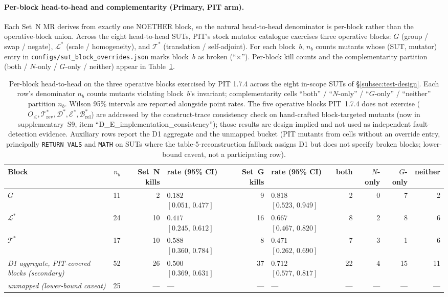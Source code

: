 \documentclass[acmsmall, screen]{acmart}
\begin{document}
\paragraph{Per-block head-to-head and complementarity (Primary, PIT arm).}
Each Set~N MR derives from exactly one NOETHER block, so the natural head-to-head denominator is per-block rather than the operative-block union. Across the eight head-to-head SUTs, PIT's stock mutator catalogue exercises three operative blocks: $G$ (group / swap / negate), $\mathcal{L}^{*}$ (scale / homogeneity), and $\mathcal{T}^{*}$ (translation / self-adjoint). For each block~$b$, $n_{b}$ counts mutants whose (SUT, mutator) entry in \texttt{configs/sut\_block\_overrides.json} marks block~$b$ as broken (``$\times$''). Per-block kill counts and the complementarity partition (both / $N$-only / $G$-only / neither) appear in Table~\ref{tab:per-block-headtohead}.

\begin{table}[h]
\centering
\caption{Per-block head-to-head on the three operative blocks
exercised by PIT 1.7.4 across the eight in-scope SUTs of
\S\ref{subsec:test-design}. Each row's denominator $n_{b}$ counts
mutants violating block~$b$'s invariant; complementarity cells
``both'' / ``$N$-only'' / ``$G$-only'' / ``neither'' partition $n_{b}$.
Wilson 95\% intervals are reported alongside point rates. The five
operative blocks PIT~1.7.4 does not exercise
($O_{\le}, \mathcal{T}^{*}_{\mathrm{rev}}, \mathcal{D}^{*},
\mathcal{E}^{*}, \mathcal{B}^{*}_{\mathrm{rel}}$) are addressed by
the construct-trace consistency check on hand-crafted
block-targeted mutants (now in supplementary~S9, item
``D\_E\_implementation\_consistency''); those results are
design-implied and not used as independent fault-detection
evidence. Auxiliary rows report the D1 aggregate and the unmapped
bucket (PIT mutants from cells without an override entry,
principally \texttt{RETURN\_VALS} and \texttt{MATH} on SUTs where
the table-5-reconstruction fallback assigns D1 but does not specify
broken blocks; lower-bound caveat, not a participating row).}
\label{tab:per-block-headtohead}
\small
\begin{tabular}{lrrlrlrrrr}
\toprule
Block & $n_{b}$ & Set~N kills & rate (95\% CI) & Set~G kills & rate (95\% CI) & both & $N$-only & $G$-only & neither \\
\midrule
$G$              & 11 &  2 & $0.182$ $[0.051,\,0.477]$ &  9 & $0.818$ $[0.523,\,0.949]$ & 2 & 0 & 7 & 2 \\
$\mathcal{L}^{*}$ & 24 & 10 & $0.417$ $[0.245,\,0.612]$ & 16 & $0.667$ $[0.467,\,0.820]$ & 8 & 2 & 8 & 6 \\
$\mathcal{T}^{*}$ & 17 & 10 & $0.588$ $[0.360,\,0.784]$ &  8 & $0.471$ $[0.262,\,0.690]$ & 7 & 3 & 1 & 6 \\
\midrule
\textit{D1 aggregate, PIT-covered blocks (secondary)}            & 52 & 26 & $0.500$ $[0.369,\,0.631]$ & 37 & $0.712$ $[0.577,\,0.817]$ & 22 & 4 & 15 & 11 \\
\textit{unmapped (lower-bound caveat)}                           & 25 & --- & --- & --- & --- & --- & --- & --- & --- \\
\bottomrule
\end{tabular}
\end{table}
\end{document}
